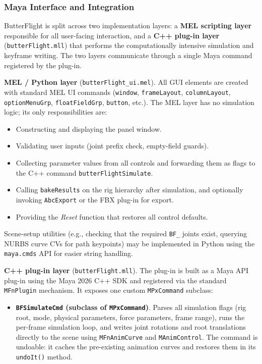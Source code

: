 \documentclass[12pt]{article}
\begin{document}
\subsubsection{Maya Interface and Integration}

ButterFlight is split across two implementation layers: a \textbf{MEL scripting layer}
responsible for all user-facing interaction, and a \textbf{C++ plug-in layer}
(\texttt{butterFlight.mll}) that performs the computationally intensive simulation and
keyframe writing. The two layers communicate through a single Maya command registered
by the plug-in.

\textbf{MEL / Python layer} (\texttt{butterFlight\_ui.mel}).
All GUI elements are created with standard MEL UI commands
(\texttt{window}, \texttt{frameLayout}, \texttt{columnLayout},
\texttt{optionMenuGrp}, \texttt{floatFieldGrp}, \texttt{button}, etc.).
The MEL layer has no simulation logic; its only responsibilities are:
\begin{itemize}
  \item Constructing and displaying the panel window.
  \item Validating user inputs (joint prefix check, empty-field guards).
  \item Collecting parameter values from all controls and forwarding them
        as flags to the C++ command \texttt{butterFlightSimulate}.
  \item Calling \texttt{bakeResults} on the rig hierarchy after simulation,
        and optionally invoking \texttt{AbcExport} or the FBX plug-in for export.
  \item Providing the \textit{Reset} function that restores all control defaults.
\end{itemize}
Scene-setup utilities (e.g., checking that the required \texttt{BF\_} joints exist,
querying NURBS curve CVs for path keypoints) may be implemented in Python using the
\texttt{maya.cmds} API for easier string handling.

\textbf{C++ plug-in layer} (\texttt{butterFlight.mll}).
The plug-in is built as a Maya API plug-in using the Maya 2026 C++ SDK and registered
via the standard \texttt{MFnPlugin} mechanism. It exposes one custom
\texttt{MPxCommand} subclass:

\begin{itemize}
  \item \textbf{\texttt{BFSimulateCmd} (subclass of \texttt{MPxCommand})}.
    Parses all simulation flags (rig root, mode, physical parameters, force
    parameters, frame range), runs the per-frame simulation loop, and writes
    joint rotations and root translations directly to the scene using
    \texttt{MFnAnimCurve} and \texttt{MAnimControl}.
    The command is undoable: it caches the pre-existing animation curves and
    restores them in its \texttt{undoIt()} method.
\end{itemize}
\end{document}
